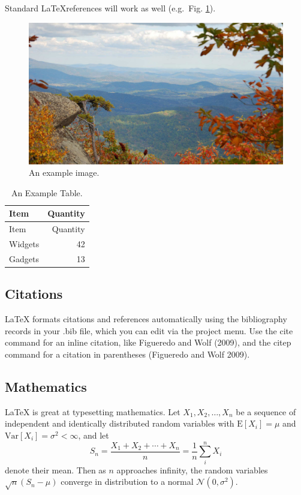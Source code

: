 \documentclass[fleqn,10pt,lineno]{wlpeerj} %
\theoremstyle{definition}
\theoremstyle{definition}
\theoremstyle{definition}
\theoremstyle{remark}
\begin{document}
Standard \LaTeX references will work as well (e.g.~Fig. \ref{fig:view}).

\begin{figure}
\includegraphics[width=1\linewidth]{view} \caption{An example image.}\label{fig:view}
\end{figure}

\begin{longtable}[]{@{}lr@{}}
\caption{\label{tab:widgets} An Example Table.}\tabularnewline
\toprule
Item & Quantity\tabularnewline
\midrule
\endfirsthead
\toprule
Item & Quantity\tabularnewline
\midrule
\endhead
Widgets & 42\tabularnewline
Gadgets & 13\tabularnewline
\bottomrule
\end{longtable}

\subsection*{Citations}\label{citations}

LaTeX formats citations and references automatically using the
bibliography records in your .bib file, which you can edit via the
project menu. Use the cite command for an inline citation, like
Figueredo and Wolf (2009), and the citep command for a citation in
parentheses (Figueredo and Wolf 2009).

\subsection*{Mathematics}\label{mathematics}

\LaTeX{} is great at typesetting mathematics. Let
\(X_1, X_2, \ldots, X_n\) be a sequence of independent and identically
distributed random variables with \(\text{E}[X_i] = \mu\) and
\(\text{Var}[X_i] = \sigma^2 < \infty\), and let
\[S_n = \frac{X_1 + X_2 + \cdots + X_n}{n}
      = \frac{1}{n}\sum_{i}^{n} X_i\] denote their mean. Then as \(n\)
approaches infinity, the random variables \(\sqrt{n}(S_n - \mu)\)
converge in distribution to a normal \(\mathcal{N}(0, \sigma^2)\).
\end{document}
